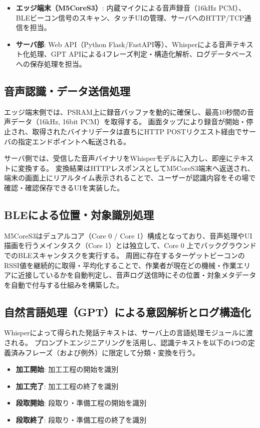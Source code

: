 \documentclass[a4paper,12pt,ja=standard,lualatex]{bxjsarticle}
\begin{document}
\begin{itemize}
    \item \textbf{エッジ端末（M5CoreS3）}: 内蔵マイクによる音声録音（16kHz PCM）、BLEビーコン信号のスキャン、タッチUIの管理、サーバへのHTTP/TCP通信を担当。
    \item \textbf{サーバ部}: Web API（Python Flask/FastAPI等）、Whisperによる音声テキスト化処理、GPT APIによる4フレーズ判定・構造化解析、ログデータベースへの保存処理を担当。
\end{itemize}

\subsection{音声認識・データ送信処理}
エッジ端末側では、PSRAM上に録音バッファを動的に確保し、最高10秒間の音声データ（16kHz, 16bit PCM）を取得する。
画面タップにより録音が開始・停止され、取得されたバイナリデータは直ちにHTTP POSTリクエスト経由でサーバの指定エンドポイントへ転送される。

サーバ側では、受信した音声バイナリをWhisperモデルに入力し、即座にテキストに変換する。
変換結果はHTTPレスポンスとしてM5CoreS3端末へ返送され、端末の画面上にリアルタイム表示されることで、ユーザーが認識内容をその場で確認・確認保存できるUIを実装した。

\subsection{BLEによる位置・対象識別処理}
M5CoreS3はデュアルコア（Core 0 / Core 1）構成となっており、音声処理やUI描画を行うメインタスク（Core 1）とは独立して、Core 0 上でバックグラウンドでのBLEスキャンタスクを実行する。
周囲に存在するターゲットビーコンのRSSI値を継続的に取得・平均化することで、作業者が現在どの機械・作業エリアに近接しているかを自動判定し、音声ログ送信時にその位置・対象メタデータを自動で付与する仕組みを構築した。

\subsection{自然言語処理（GPT）による意図解析とログ構造化}
Whisperによって得られた発話テキストは、サーバ上の言語処理モジュールに渡される。
プロンプトエンジニアリングを活用し、認識テキストを以下の4つの定義済みフレーズ（および例外）に限定して分類・変換を行う。

\begin{itemize}
    \item \textbf{加工開始}: 加工工程の開始を識別
    \item \textbf{加工完了}: 加工工程の終了を識別
    \item \textbf{段取開始}: 段取り・準備工程の開始を識別
    \item \textbf{段取終了}: 段取り・準備工程の終了を識別
\end{itemize}
\end{document}
